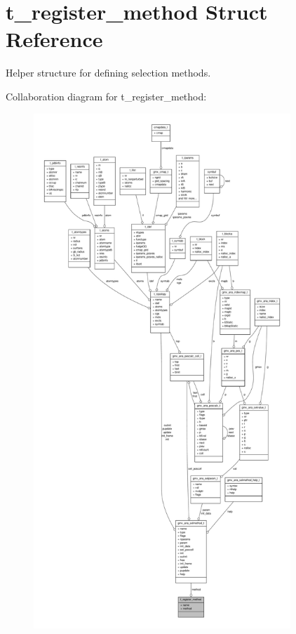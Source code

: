 \hypertarget{structt__register__method}{\section{t\-\_\-register\-\_\-method \-Struct \-Reference}
\label{structt__register__method}
}


\-Helper structure for defining selection methods.  




\-Collaboration diagram for t\-\_\-register\-\_\-method\-:
\nopagebreak
\begin{figure}[H]
\begin{center}
\leavevmode
\includegraphics[height=550pt]{structt__register__method__coll__graph}
\end{center}
\end{figure}
